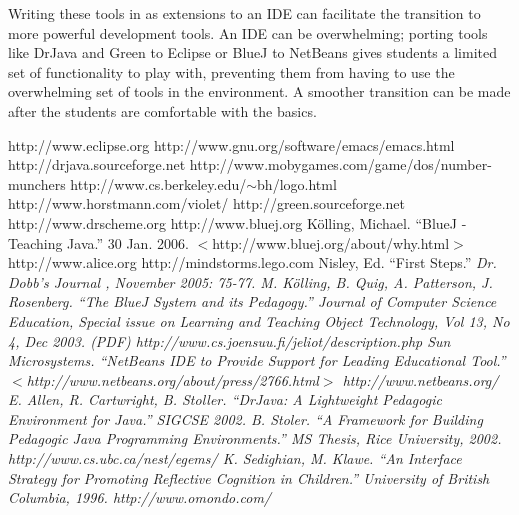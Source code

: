\documentclass{sig-alt-release}
\begin{document}
  Writing these tools in as extensions to an IDE can facilitate the transition
  to more powerful development tools. An IDE can be overwhelming; porting tools
  like DrJava and Green to Eclipse or BlueJ to NetBeans gives students a limited
  set of functionality to play with, preventing them from having to use the
  overwhelming set of tools in the environment. A smoother transition can be
  made after the students are comfortable with the basics.

\begin{thebibliography}{99}
    http://www.eclipse.org
   \label{emacs}
    http://www.gnu.org/software/emacs/emacs.html
   \label{drjava}
    http://drjava.sourceforge.net
   \label{munchers}
    http://www.mobygames.com/game/dos/number-munchers
   \label{logo}
    http://www.cs.berkeley.edu/$\sim$bh/logo.html
   \label{Violet}
    http://www.horstmann.com/violet/
   \label{green}
    http://green.sourceforge.net
   \label{drscheme}
    http://www.drscheme.org
   \label{bluej}
    http://www.bluej.org
    K\"olling, Michael.
    ``BlueJ - Teaching Java.''
    30 Jan. 2006.
    $<$http://www.bluej.org/about/why.html$>$
   \label{alice}
    http://www.alice.org
    http://mindstorms.lego.com
    Nisley, Ed.
    ``First Steps.''
    \em Dr. Dobb's Journal \em, November 2005: 75-77.
    M. K\"olling, B. Quig, A. Patterson, J. Rosenberg.
    ``The BlueJ System and its Pedagogy.''
    \em Journal of Computer Science Education, Special issue on Learning and
      Teaching Object Technology\em, Vol 13, No 4, Dec 2003. (PDF)
   \label{Jeliot}
    http://www.cs.joensuu.fi/jeliot/description.php
    Sun Microsystems.
    ``NetBeans IDE to Provide Support for Leading Educational Tool.''
    $<$http://www.netbeans.org/about/press/2766.html$>$
   \label{netbeans}
    http://www.netbeans.org/
    E. Allen, R. Cartwright, B. Stoller.
    ``DrJava: A Lightweight Pedagogic Environment for Java.''
    SIGCSE 2002.
   \label{BStoler}
    B. Stoler.
    ``A Framework for Building Pedagogic Java Programming Environments.''
    MS Thesis, Rice University, 2002.
    http://www.cs.ubc.ca/nest/egems/
    K. Sedighian, M. Klawe.
    ``An Interface Strategy for Promoting Reflective Cognition in Children.''
    University of British Columbia, 1996.
   \label{eclipseuml}
    http://www.omondo.com/
\end{thebibliography}
\end{document}
